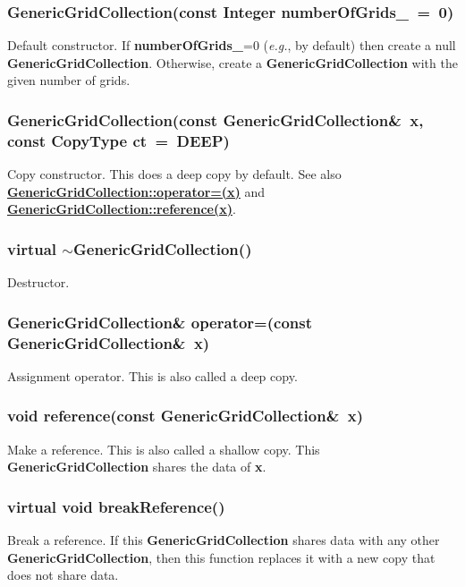 \documentclass{article}
\begin{document}
  \subsubsection{GenericGridCollection(const Integer numberOfGrids\_~=~0)}
  \label{GenericGridCollection::GenericGridCollection(numberOfGrids_)}
    Default constructor.
    If \textbf{numberOfGrids\_}=0 ({\sl{}e.g.}, by default) then create a null \textbf{GenericGridCollection}.
    Otherwise, create a \textbf{GenericGridCollection} with the given number of grids.

  \subsubsection{GenericGridCollection(const GenericGridCollection\&~x, const CopyType ct~=~DEEP)}
  \label{GenericGridCollection::GenericGridCollection(x,ct)}
    Copy constructor.
    This does a deep copy by default.
    See also {\bf{}\hyperref{operator=(x)}{operator=(x) \rm(\S}{)}{GenericGridCollection::operator=(x)}}
    and {\bf{}\hyperref{reference(x)}{reference(x) \rm(\S}{)}{GenericGridCollection::reference(x)}}.

  \subsubsection{virtual $\sim$GenericGridCollection()}
  \label{GenericGridCollection::tilde_GenericGridCollection()}
    Destructor.

  \subsubsection{GenericGridCollection\& operator=(const GenericGridCollection\&~x)}
  \label{GenericGridCollection::operator=(x)}
    Assignment operator.
    This is also called a deep copy.
  \subsubsection{void reference(const GenericGridCollection\&~x)}
  \label{GenericGridCollection::reference(x)}
    Make a reference.  This is also called a shallow copy.  This \textbf{GenericGridCollection} shares the data of \textbf{x}.
  \subsubsection{virtual void breakReference()}
  \label{GenericGridCollection::breakReference()}
    Break a reference.  If this \textbf{GenericGridCollection} shares data with any other \textbf{GenericGridCollection},
    then this function replaces it with a new copy that does not share data.
\end{document}

